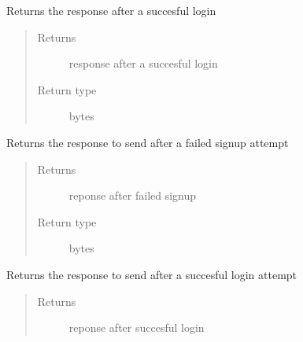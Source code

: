 \documentclass[letterpaper,10pt,english]{sphinxmanual}
\begin{document}
\begin{fulllineitems}
\begin{fulllineitems}
\begin{quote}
\begin{description}
\end{description}\end{quote}

\end{fulllineitems}


\begin{fulllineitems}
\label{\detokenize{Message:Message.Message._login_successful}}
Returns the response after a succesful login
\begin{quote}\begin{description}
\item[{Returns}] \leavevmode
response after a succesful login

\item[{Return type}] \leavevmode
bytes

\end{description}\end{quote}

\end{fulllineitems}


\begin{fulllineitems}
\label{\detokenize{Message:Message.Message._signup_failed}}
Returns the response to send after a failed signup attempt
\begin{quote}\begin{description}
\item[{Returns}] \leavevmode
reponse after failed signup

\item[{Return type}] \leavevmode
bytes

\end{description}\end{quote}

\end{fulllineitems}


\begin{fulllineitems}
\label{\detokenize{Message:Message.Message._successfully_signed_up}}
Returns the response to send after a succesful login attempt
\begin{quote}\begin{description}
\item[{Returns}] \leavevmode
reponse after succesful login


\end{description}
\end{quote}
\end{fulllineitems}
\end{fulllineitems}
\end{document}
